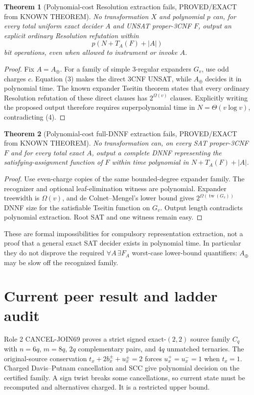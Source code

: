 \documentclass[11pt]{article}
\newtheorem{theorem}{Theorem}
\begin{document}
\begin{theorem}[Polynomial-cost Resolution extraction fails, PROVED/EXACT from KNOWN THEOREM]
No transformation $X$ and polynomial $p$ can, for \emph{every} total uniform exact decider $A$ and UNSAT proper-3CNF $F$, output an explicit ordinary Resolution refutation within
\[
p(N+T_A(F)+|A|)
\tag{4}
\]
bit operations, even when allowed to instrument or invoke $A$.
\end{theorem}
\begin{proof}
Fix $A=A_{\oplus}$. For a family of simple 3-regular expanders $G_v$, use odd charges $c$. Equation (3) makes the direct 3CNF UNSAT, while $A_{\oplus}$ decides it in polynomial time. The known expander Tseitin theorem states that every ordinary Resolution refutation of these direct clauses has $2^{\Omega(v)}$ clauses. Explicitly writing the proposed output therefore requires superpolynomial time in $N=\Theta(v\log v)$, contradicting (4).
\end{proof}

\begin{theorem}[Polynomial-cost full-DNNF extraction fails, PROVED/EXACT from KNOWN THEOREM]
No transformation can, on every SAT proper-3CNF $F$ and for every total exact $A$, output a complete DNNF representing the satisfying-assignment function of $F$ within time polynomial in $N+T_A(F)+|A|$.
\end{theorem}
\begin{proof}
Use even-charge copies of the same bounded-degree expander family. The recognizer and optional leaf-elimination witness are polynomial. Expander treewidth is $\Omega(v)$, and de Colnet--Mengel's lower bound gives $2^{\Omega(\operatorname{tw}(G_v))}$ DNNF size for the satisfiable Tseitin function on $G_v$. Output length contradicts polynomial extraction. Root SAT and one witness remain easy.
\end{proof}

These are formal impossibilities for compulsory representation extraction, not a proof that a general exact SAT decider exists in polynomial time. In particular they do not disprove the required $\forall A\,\exists F_A$ worst-case lower-bound quantifiers: $A_{\oplus}$ may be slow off the recognized family.

\section{Current peer result and ladder audit}
Role 2 CANCEL-JOIN69 proves a strict signed exact-$(2,2)$ source family $C_q$ with $n=6q$, $m=8q$, $2q$ complementary pairs, and $4q$ unmatched ternaries. The original-source conservation $t_x+2b_x^\pm+u_x^\pm=2$ forces $u_x^+=u_x^-=1$ when $t_x=1$. Charged Davis--Putnam cancellation and SCC give polynomial decision on the certified family. A sign twist breaks some cancellations, so current state must be recomputed and alternatives charged. It is a restricted upper bound.
\end{document}
